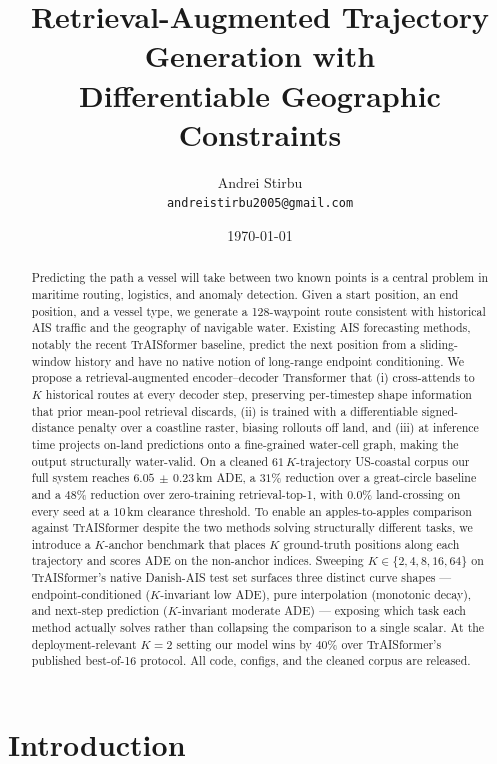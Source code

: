 \documentclass[11pt]{article}
\title{Retrieval-Augmented Trajectory Generation with\\
       Differentiable Geographic Constraints}
\author{Andrei Stirbu \\
        \texttt{andreistirbu2005@gmail.com}}
\date{\today}
\begin{document}
\maketitle

\begin{abstract}
Predicting the path a vessel will take between two known points is a
central problem in maritime routing, logistics, and anomaly detection.
Given a start position, an end position, and a vessel type, we generate
a 128-waypoint route consistent with historical AIS traffic and the
geography of navigable water. Existing AIS forecasting methods, notably
the recent TrAISformer baseline, predict the next position from a
sliding-window history and have no native notion of long-range endpoint
conditioning. We propose a retrieval-augmented encoder--decoder
Transformer that (i) cross-attends to $K$ historical routes at every
decoder step, preserving per-timestep shape information that prior
mean-pool retrieval discards, (ii) is trained with a differentiable
signed-distance penalty over a coastline raster, biasing rollouts off
land, and (iii) at inference time projects on-land predictions onto a
fine-grained water-cell graph, making the output structurally
water-valid. On a cleaned $61\,K$-trajectory US-coastal corpus our full
system reaches $6.05\,\pm\,0.23$\,km ADE, a $31$\% reduction over a
great-circle baseline and a $48$\% reduction over zero-training
retrieval-top-1, with $0.0$\% land-crossing on every seed at a $10$\,km
clearance threshold. To enable an apples-to-apples comparison against
TrAISformer despite the two methods solving structurally different
tasks, we introduce a $K$-anchor benchmark that places $K$ ground-truth
positions along each trajectory and scores ADE on the non-anchor
indices. Sweeping $K \in \{2, 4, 8, 16, 64\}$ on TrAISformer's native
Danish-AIS test set surfaces three distinct curve shapes ---
endpoint-conditioned ($K$-invariant low ADE), pure interpolation
(monotonic decay), and next-step prediction ($K$-invariant moderate
ADE) --- exposing which task each method actually solves rather than
collapsing the comparison to a single scalar. At the deployment-relevant
$K=2$ setting our model wins by $40$\% over TrAISformer's published
best-of-16 protocol. All code, configs, and the cleaned corpus are
released.
\end{abstract}

\section{Introduction}
\label{sec:intro}
\end{document}
